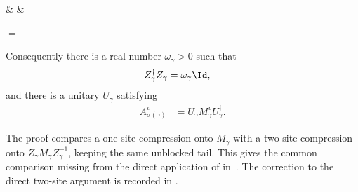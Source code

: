 \begin{lemma}
\begin{center}
\begin{tenkz}[rows={wire}, cols=3, west=open, east=open]
             &
             &
        \end{tenkz}
        $ = $
        \begin{tenkz}[rows={wire}, cols=1, west=open, east=open]
        \end{tenkz}
    \end{center}
    Consequently there is a real number $\omega_\gamma>0$ such that
    \begin{align}
        Z_\gamma^\dagger Z_\gamma
         & =\omega_\gamma\Id,
        \label{eq:mpdo_bnt_mixed_prefix_scalar_gram}
    \end{align}
    and there is a unitary $U_\gamma$ satisfying
    \begin{align}
        A_{\sigma(\gamma)}^v
         & =U_\gamma M_\gamma^vU_\gamma^\dagger.
        \label{eq:mpdo_bnt_mixed_prefix_unitary_conjugacy}
    \end{align}

    The proof compares a one-site compression onto $M_\gamma$ with a
    two-site compression onto $Z_\gamma M_\gamma Z_\gamma^{-1}$,
    keeping the same unblocked tail. This gives the common comparison
    missing from the direct application of
    \cite[Proposition~4.13, lines~1909--1919]{Cirac2016MPDO_arXiv}
    in~\cite[Appendix~C.4, lines~2048--2057]{Cirac2016MPDO_arXiv}.
    The correction to the direct two-site argument is recorded in
    \cite{gap:cpsv16_two_site_sector_unitary_gauge_gap}.
\end{lemma}

